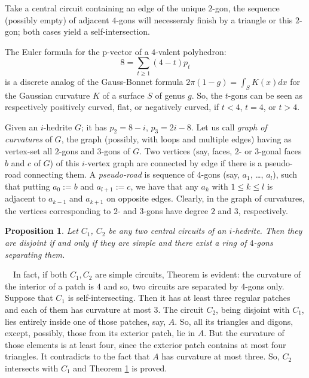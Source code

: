 \documentclass[12pt]{article}
\newtheorem{proposition}{Proposition}
\newcommand{\proof}{\noindent{\bf Proof.}\ \ }
\begin{document}
Take a central circuit containing an edge of the unique $2$-gon, the sequence (possibly empty) of adjacent $4$-gons will necesseraly finish by a triangle or this $2$-gon; both cases yield a self-intersection.






The Euler formula for the p-vector of a $4$-valent polyhedron:
$$8=\sum_{t\geq 1} (4-t)p_t$$
is a discrete analog of the Gauss-Bonnet formula $2\pi(1-g)=\int_{S} K(x)dx$ for the Gaussian curvature $K$ of a surface $S$ of genus $g$. So, the $t$-gons can be seen as respectively positively curved, flat, or negatively curved, if $t<4$, $t=4$, or $t>4$.


Given an $i$-hedrite $G$; it has $p_2=8-i$, $p_3=2i-8$. Let us 
call {\em graph of curvatures} of $G$, the graph (possibly, with loops 
and multiple edges) having as vertex-set all $2$-gons and $3$-gons of $G$. 
Two vertices (say, faces, $2$- or $3$-gonal faces $b$ and $c$ of $G$) of 
this $i$-vertex graph are connected by edge if there is a pseudo-road 
connecting them. A {\em pseudo-road} is sequence of $4$-gons 
(say, $a_1$, \dots, $a_l$), such that putting $a_0:=b$ and $a_{l+1}:=c$, 
we have that any $a_k$ with $1\leq k\leq l$ is adjacent to $a_{k-1}$ 
and $a_{k+1}$ on opposite edges. Clearly, in the graph of curvatures, 
the vertices corresponding to $2$- and $3$-gons have degree $2$ and $3$, 
respectively.







\begin{proposition}\label{intersec}
Let $C_1$, $C_2$ be any two central circuits of an $i$-hedrite. Then 
they are disjoint if and only if they are simple and there exist a 
ring of $4$-gons separating them.

\end{proposition}
\proof In fact, if both $C_1,C_2$ are simple circuits, Theorem is evident:
the curvature of the interior of a patch is $4$ and so, two
circuits are separated by $4$-gons only. Suppose that $C_1$ is 
self-intersecting. Then it has at least three regular patches and each 
of them has curvature at most $3$.
The circuit $C_2$, being disjoint with $C_1$, lies entirely inside one 
of those patches, say, $A$. So, all its triangles and digons, except, 
possibly, those from its exterior patch, lie in $A$. But the curvature 
of those elements is at least four, since the exterior
patch contains at most four triangles. It contradicts to the fact that $A$
has curvature at most three. So, $C_2$ intersects with $C_1$ and 
Theorem \ref{intersec} is proved.
\end{document}
